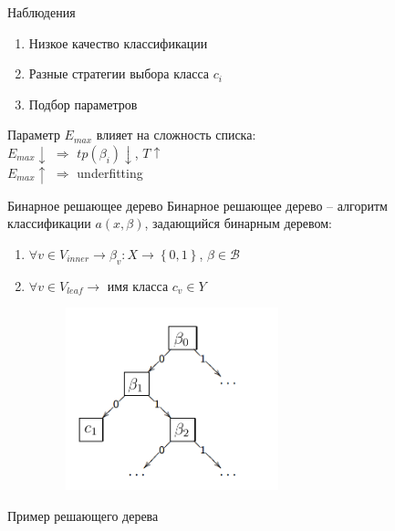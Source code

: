 \documentclass[10pt]{beamer}
\begin{document}
\begin{frame}{Наблюдения}
	\begin{enumerate}[--]
	\item Низкое качество классификации
	\item Разные стратегии выбора класса $c_i$
	\item Подбор параметров
	\end{enumerate}
	\bigbreak
	\pause
	Параметр $E_{max}$ влияет на сложность списка:\\
	$E_{max} \downarrow$ $\Rightarrow$ $tp(\beta_i) \downarrow$, $T \uparrow$\\
	$E_{max} \uparrow$ $\Rightarrow$ underfitting
\end{frame}


\begin{frame}{Бинарное решающее дерево}
	Бинарное решающее дерево -- алгоритм классификации $a(x, \beta)$, задающийся бинарным деревом:\\
	\begin{enumerate}[--]
	\item $\forall v \in V_{inner} \rightarrow \beta_v: X \rightarrow \left\{ 0,1\right\}$, $\beta \in \mathcal{B}$
	\item $\forall v \in V_{leaf} \rightarrow $ имя класса $c_v \in Y$\\
	
	\begin{figure}[htbp]
	  \includegraphics[height=150pt, keepaspectratio = true]{images/binary_tree}   
	\end{figure}
	\end{enumerate}
\end{frame}

\begin{frame}{Пример решающего дерева}
\end{frame}
\end{document}
